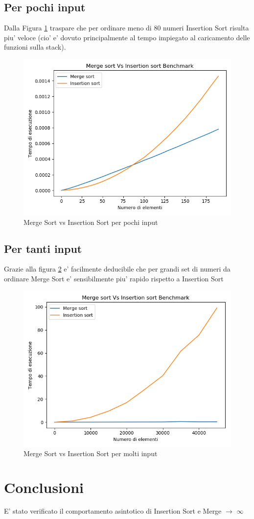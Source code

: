 \documentclass[a4paper]{article}
\begin{document}
\subsection{Per pochi input}
Dalla Figura \ref{fig:SmallInsMerge} traspare che per ordinare meno di 80 numeri Insertion Sort risulta piu' veloce (cio' e' dovuto principalmente al tempo impiegato al caricamento delle funzioni sulla stack).	
		\begin{figure}[!htb]
		\centering
		\includegraphics[scale=0.5]{myplot}
		\caption{Merge Sort vs Insertion Sort per pochi input}
		\label{fig:SmallInsMerge}
		\end{figure}
\newpage		
\subsection{Per tanti input}
Grazie alla figura \ref{fig:BigInsMerge} e' facilmente deducibile che per grandi set di numeri da ordinare Merge Sort  e' sensibilmente piu' rapido rispetto a Insertion Sort 
 
		\begin{figure}[!htb]
		\centering
		\includegraphics[scale=0.5]{myplot2}
		\caption{Merge Sort vs Insertion Sort per molti input}
		\label{fig:BigInsMerge}
		\end{figure}

\section{Conclusioni}
E' stato verificato il comportamento asintotico di Insertion Sort e Merge $\longrightarrow$  \(\infty\)
\end{document}
